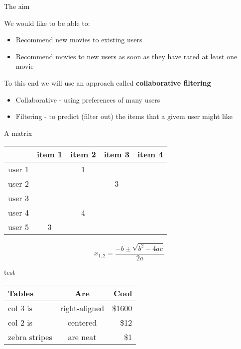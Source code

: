 \documentclass[ignorenonframetext,]{beamer}
\providecommand{\tightlist}{%
  \setlength{\itemsep}{0pt}\setlength{\parskip}{0pt}}
\begin{document}
\begin{frame}{The aim}
\protect\hypertarget{the-aim}{}

We would like to be able to:

\begin{itemize}
\tightlist
\item
  Recommend new movies to existing users
\item
  Recommend movies to new users as soon as they have rated at least one
  movie
\end{itemize}

To this end we will use an approach called \textbf{collaborative
filtering}

\begin{itemize}
\tightlist
\item
  Collaborative - using preferences of many users
\item
  Filtering - to predict (filter out) the items that a givem user might
  like
\end{itemize}

\end{frame}

\begin{frame}{A matrix}
\protect\hypertarget{a-matrix}{}

\begin{longtable}[]{@{}lcccc@{}}
\toprule
& item 1 & item 2 & item 3 & item 4\tabularnewline
\midrule
\endhead
user 1 & & 1 & &\tabularnewline
user 2 & & & 3 &\tabularnewline
user 3 & & & &\tabularnewline
user 4 & & 4 & &\tabularnewline
user 5 & 3 & & &\tabularnewline
\bottomrule
\end{longtable}

\[ x_{1,2} = \frac{- b \pm \sqrt{b^2 - 4ac}}{2a} \]

\end{frame}

\begin{frame}{test}
\protect\hypertarget{test}{}

\begin{longtable}[]{@{}lcr@{}}
\toprule
Tables & Are & Cool\tabularnewline
\midrule
\endhead
col 3 is & right-aligned & \$1600\tabularnewline
col 2 is & centered & \$12\tabularnewline
zebra stripes & are neat & \$1\tabularnewline
\bottomrule
\end{longtable}

\end{frame}
\end{document}
